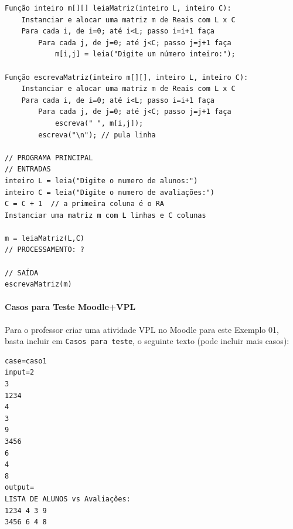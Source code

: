 \documentclass[12pt,a4paper]{article}
\begin{document}
    \begin{verbatim}
Função inteiro m[][] leiaMatriz(inteiro L, inteiro C):
    Instanciar e alocar uma matriz m de Reais com L x C
    Para cada i, de i=0; até i<L; passo i=i+1 faça
        Para cada j, de j=0; até j<C; passo j=j+1 faça
            m[i,j] = leia("Digite um número inteiro:");

Função escrevaMatriz(inteiro m[][], inteiro L, inteiro C):
    Instanciar e alocar uma matriz m de Reais com L x C
    Para cada i, de i=0; até i<L; passo i=i+1 faça
        Para cada j, de j=0; até j<C; passo j=j+1 faça
            escreva(" ", m[i,j]);
        escreva("\n"); // pula linha

// PROGRAMA PRINCIPAL
// ENTRADAS
inteiro L = leia("Digite o numero de alunos:")
inteiro C = leia("Digite o numero de avaliações:")
C = C + 1  // a primeira coluna é o RA
Instanciar uma matriz m com L linhas e C colunas

m = leiaMatriz(L,C)
// PROCESSAMENTO: ?

// SAÍDA
escrevaMatriz(m)
\end{verbatim}

    \hypertarget{casos-para-teste-moodlevpl}{%
\paragraph{Casos para Teste
Moodle+VPL}\label{casos-para-teste-moodlevpl}}

Para o professor criar uma atividade VPL no Moodle para este Exemplo 01,
basta incluir em \texttt{Casos\ para\ teste}, o seguinte texto (pode
incluir mais casos):

\begin{verbatim}
case=caso1
input=2
3
1234
4
3
9
3456
6
4
8
output=
LISTA DE ALUNOS vs Avaliações:
1234 4 3 9
3456 6 4 8
\end{verbatim}
\end{document}
